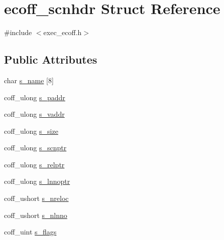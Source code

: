 \hypertarget{structecoff__scnhdr}{
\section{ecoff\_\-scnhdr Struct Reference}
\label{structecoff__scnhdr}
}


{\ttfamily \#include $<$exec\_\-ecoff.h$>$}

\subsection*{Public Attributes}
\begin{DoxyCompactItemize}
\item 
char \hyperlink{structecoff__scnhdr_a1f2d2b81e9f0cd194152febd54f5a60d}{s\_\-name} \mbox{[}8\mbox{]}
\item 
coff\_\-ulong \hyperlink{structecoff__scnhdr_ae42d0522499118c4e0619d1b7e3a0123}{s\_\-paddr}
\item 
coff\_\-ulong \hyperlink{structecoff__scnhdr_a175daaf37629fc3f7009df00226bfe8c}{s\_\-vaddr}
\item 
coff\_\-ulong \hyperlink{structecoff__scnhdr_ac7e80fc84ba691a6a19e15fe9b2b7975}{s\_\-size}
\item 
coff\_\-ulong \hyperlink{structecoff__scnhdr_afaf5f4e324e14cf5215871f61d7b65a3}{s\_\-scnptr}
\item 
coff\_\-ulong \hyperlink{structecoff__scnhdr_aabb97d798a8099732330465145868664}{s\_\-relptr}
\item 
coff\_\-ulong \hyperlink{structecoff__scnhdr_af5727b471bff83f01f93c99510e677e0}{s\_\-lnnoptr}
\item 
coff\_\-ushort \hyperlink{structecoff__scnhdr_a844726d2153a3eb0075680c12a9828b7}{s\_\-nreloc}
\item 
coff\_\-ushort \hyperlink{structecoff__scnhdr_ab1e4817f1922e0f96392968eb5e5a8f8}{s\_\-nlnno}
\item 
coff\_\-uint \hyperlink{structecoff__scnhdr_ad13d56f39169e77dc3316a45880a9807}{s\_\-flags}
\end{DoxyCompactItemize}


